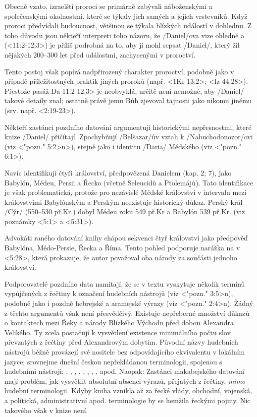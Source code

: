 Obecně vzato, izraelští proroci se primárně zabývali náboženskými a společenskými okolnostmi, které se týkaly jich samých a jejich vrstevníků. Když proroci předvídali budoucnost, většinou se týkala blízkých událostí v dohlednu.
Z toho důvodu jsou někteří interpreti toho názoru, že \x/Daniel/ova vize ohledně  a  (<11:2-12:3>) je příliš podrobná na to, aby ji mohl sepsat \x/Daniel/, který žil nějakých 200--300 let před událostmi, zachycenými v proroctví.

Tento postoj však popírá nadpřirozený charakter proroctví, podobně jako v případě příležitostných praktik jiných proroků (např. <1Kr 13:2>; <Iz 44:28>). Přestože pasáž  \<Da 11:2-12:3> je neobvyklá, určitě není nemožné, aby \x/Daniel/ takové detaily znal; ostatně právě jemu Bůh zjevoval tajnosti jako nikomu jinému (srv. např. <2:19-23>).  

Někteří zastánci pozdního datování argumentují historickými nepřesnostmi, které knize \x/Daniel/ přičítají.
Zpochybňují \x/Belšazar/ův vztah k \x/Nabuchodonozor/ovi (viz <"pozn." 5:2>n>), stejně jako i identitu  \x/Daria/ Médského (viz <"pozn." 6:1>). 

Navíc identifikují čtyři království, předpovězená Danielem (kap. 2; 7), jako Babylón, Médeu, Persii a Řecko (včetně Seleucidů a Ptolemájů). Tato identifikace je však problematická, protože pro nezávislé Médské království v intervalu mezi královstvími Babylónským a Perským neexistuje historický důkaz.
Perský král \x/Cýr/ (550--530 př.Kr.) dobyl Médeu roku 549 př.Kr a Babylón 539 př.Kr. (viz poznámky <5:1> a <5:31>).

Advokáti raného datování knihy chápou sekvenci čtyř království jako předpověď Babylóna, Médo-Persie, Řecka a Říma. 
Tento pohled podporuje narážka na  v <5:28>, která prokazuje, že autor považoval oba národy za součásti jednoho království.

Podporovatelé pozdního data namítají, že se v textu vyskytuje několik termínů vypůjčených z řečtiny k označení hudebních nástrojů (viz <"pozn." 3:5>n), podobně jako i  pozdně hebrejské a aramejské výrazy (viz <"pozn." 2:4>n).
Žádný z těchto argumentů však není přesvědčivý.
Existuje nepřeberné množství důkazů o kontaktech mezi Řeky a národy Blízkého Východu před dobou Alexandra Velikého. Ty zcela postačují k vysvětlení existence minimálního počtu slov převzatých z řečtiny před Alexandrovým dobytím. 
Původní názvy hudebních nástrojů běžně provázejí své nositele bez odpovídajícího ekvivalentu v lokálním jazyce; srovnejme dnešní českou nepřekládanou terminologii, spojenou s hudebními nástroji:  , , , , , , , ,  apod.
Naopak: Zastánci makabejského datování mají problém, jak vysvětlit absolutní absenci výrazů, přejatých z řečtiny, {\it mimo\/} hudební terminologii. Kdyby kniha vznikla až za řecké vlády, obchodní, vojenská, a politická, administrativní apod. terminologie  by se hemžila řeckými pojmy. Nic takového však v knize není.

